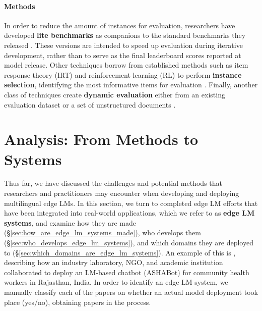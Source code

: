 \documentclass[11pt,a4paper]{article}
\begin{document}
\paragraph{Methods}
In order to reduce the amount of instances for evaluation,
researchers have developed \textbf{lite benchmarks} as companions to the standard benchmarks they released \citep{singh-etal-2025-global,ojo-etal-2025-afrobench,micallef-borg-2025-melabenchv1}.
These versions are intended to speed up evaluation during iterative development, rather than to serve as the final leaderboard scores reported at model release.
Other techniques borrow from established methods such as item response theory (IRT) and reinforcement learning (RL) to perform \textbf{instance selection}, identifying the most informative items for evaluation \citep{hofmann2025fluid,zouhar-etal-2025-how,li2025active}.
Finally, another class of techniques create \textbf{dynamic evaluation} either from an existing evaluation dataset \citep{kim2025benchhub} or a set of unstructured documents \citep{shashidhar2025yourbench}.

\section{Analysis: From Methods to Systems}

Thus far, we have discussed the challenges and potential methods that researchers and practitioners may encounter when developing and deploying multilingual edge LMs.
In this section, we turn to completed edge LM efforts that have been integrated into real-world applications, which we refer to as \textbf{edge LM systems}, and examine
how they are made (\S\ref{sec:how_are_edge_lm_systems_made}),
who develops them (\S\ref{sec:who_develops_edge_lm_systems}),
and which domains they are deployed to (\S\ref{sec:which_domains_are_edge_lm_systems}).
An example of this is \citet{ramjee-etal-2025-ashabot}, describing how an industry laboratory, NGO, and academic institution collaborated to deploy an LM-based chatbot (ASHABot) for community health workers in Rajasthan, India.
In order to identify an edge LM system,
we manually classify each of the \numpapers{} papers on whether an actual model deployment took place (yes/no), obtaining \numdeploymentpapers{} papers in the process.
\end{document}
